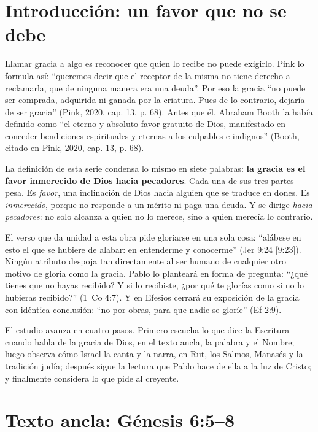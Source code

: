\documentclass[11pt,letterpaper]{article}
\newcommand{\destacar}[1]{\textbf{\textcolor{azul}{#1}}}
\begin{document}
\section{Introducción: un favor que no se debe}

Llamar gracia a algo es reconocer que quien lo recibe no puede exigirlo. Pink lo formula así: ``queremos decir que el receptor de la misma no tiene derecho a reclamarla, que de ninguna manera era una deuda''. Por eso la gracia ``no puede ser comprada, adquirida ni ganada por la criatura. Pues de lo contrario, dejaría de ser gracia'' (Pink, 2020, cap. 13, p. 68). Antes que él, Abraham Booth la había definido como ``el eterno y absoluto favor gratuito de Dios, manifestado en conceder bendiciones espirituales y eternas a los culpables e indignos'' (Booth, citado en Pink, 2020, cap. 13, p. 68).

La definición de esta serie condensa lo mismo en siete palabras: \destacar{la gracia es el favor inmerecido de Dios hacia pecadores}. Cada una de sus tres partes pesa. Es \emph{favor}, una inclinación de Dios hacia alguien que se traduce en dones. Es \emph{inmerecido}, porque no responde a un mérito ni paga una deuda. Y se dirige \emph{hacia pecadores}: no solo alcanza a quien no lo merece, sino a quien merecía lo contrario.

El verso que da unidad a esta obra pide gloriarse en una sola cosa: ``alábese en esto el que se hubiere de alabar: en entenderme y conocerme'' (Jer 9:24 [9:23]). Ningún atributo despoja tan directamente al ser humano de cualquier otro motivo de gloria como la gracia. Pablo lo planteará en forma de pregunta: ``¿qué tienes que no hayas recibido? Y si lo recibiste, ¿por qué te glorías como si no lo hubieras recibido?'' (1~Co 4:7). Y en Efesios cerrará su exposición de la gracia con idéntica conclusión: ``no por obras, para que nadie se gloríe'' (Ef 2:9).

El estudio avanza en cuatro pasos. Primero escucha lo que dice la Escritura cuando habla de la gracia de Dios, en el texto ancla, la palabra y el Nombre; luego observa cómo Israel la canta y la narra, en Rut, los Salmos, Manasés y la tradición judía; después sigue la lectura que Pablo hace de ella a la luz de Cristo; y finalmente considera lo que pide al creyente.

\section{Texto ancla: Génesis 6:5--8}\label{sec:noe-gracia}
\end{document}
